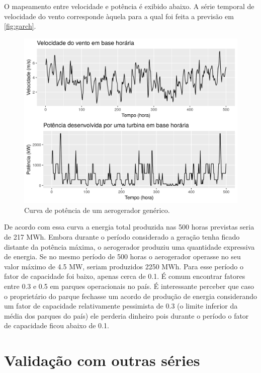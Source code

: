 \documentclass[
	12pt,				%
	openright,			%
	oneside,			%
	a4paper,			%
	english,			%
	french,				%
	spanish,			%
	brazil				%
	]{abntex2}
\begin{document}
O mapeamento entre velocidade e potência é exibido abaixo. A série temporal de velocidade do vento corresponde àquela para a qual foi feita a previsão em 	\ref{fig:garch}.

\begin{figure}[h]
    \centering
	\includegraphics[width=\textwidth]{speed_power}
	\caption{Curva de potência de um aerogerador genérico.}
\end{figure}
\FloatBarrier

De acordo com essa curva a energia total produzida nas 500 horas previstas seria de 217 MWh. Embora durante o período considerado a geração tenha ficado distante da potência máxima, o aerogerador produziu uma quantidade expressiva de energia. Se no mesmo período de 500 horas o aerogerador operasse no seu valor máximo de 4.5 MW, seriam produzidos 2250 MWh. Para esse período o fator de capacidade foi baixo, apenas cerca de 0.1. É comum encontrar fatores entre 0.3 e 0.5 em parques operacionais no país. É interessante perceber que caso o proprietário do parque fechasse um acordo de produção de energia considerando um fator de capacidade relativamente pessimista de 0.3 (o limite inferior da média dos parques do país) ele perderia dinheiro pois durante o período o fator de capacidade ficou abaixo de 0.1.

\chapter{Validação com outras séries}
\end{document}

